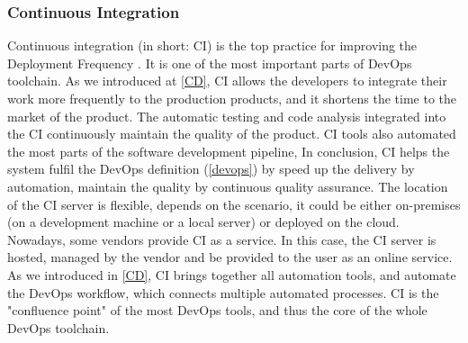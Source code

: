 \subsubsection{Continuous Integration}
Continuous integration (in short: CI) is the top practice for improving the Deployment Frequency \cite{velasquez2014state}. It is one of the most important parts of DevOps toolchain. As we introduced at \ref{CD}, CI allows the developers to integrate their work more frequently to the production products, and it shortens the time to the market of the product. The automatic testing and code analysis integrated into the CI continuously maintain the quality of the product. CI tools also automated the most parts of the software development pipeline, In conclusion, CI helps the system fulfil the DevOps definition (\ref{devops}) by speed up the delivery by automation, maintain the quality by continuous quality assurance. 
The location of the CI server is flexible, depends on the scenario, it could be either on-premises (on a development machine or a local server) or deployed on the cloud. Nowadays, some vendors provide CI as a service. In this case, the CI server is hosted, managed by the vendor and be provided to the user as an online service. As we introduced in \ref{CD}, CI brings together all automation tools, and automate the DevOps workflow, which connects multiple automated processes. CI is the "confluence point" of the most DevOps tools, and thus the core of the whole DevOps toolchain.
